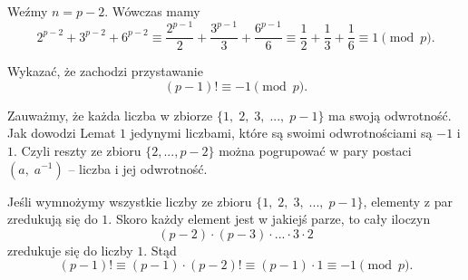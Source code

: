 \noindent
Weźmy $n = p-2$. Wówczas mamy
\[ 
	2^{p-2} + 3^{p-2} + 6^{p-2} \equiv \frac{2^{p-1}}{2} + \frac{3^{p-1}}{3} + \frac{6^{p-1}}{6} \equiv \frac{1}{2} + \frac{1}{3} + \frac{1}{6} \equiv 1 \pmod{p}.
\]

\begin{problem}{4}
	Wykazać, że zachodzi przystawanie
	\[
		(p - 1)! \equiv -1 \pmod{p}.
	\]
\end{problem}

\noindent
Zauważmy, że każda liczba w zbiorze $\{1,\; 2,\; 3,\; ...,\; p-1\}$ ma swoją odwrotność. Jak dowodzi Lemat $1$ jedynymi liczbami, które są swoimi odwrotnościami są $-1$ i $1$. Czyli reszty ze zbioru $\{2, ..., p-2\}$ można pogrupować w pary postaci $(a,\; a^{-1})$ -- liczba i jej odwrotność. 

Jeśli wymnożymy wszystkie liczby ze zbioru $\{1,\; 2,\; 3,\; ...,\; p-1\}$, elementy z par zredukują się do $1$. Skoro każdy element jest w jakiejś parze, to cały iloczyn 
\[
	(p-2)\cdot (p-3) \cdot ... \cdot 3 \cdot 2
\] 
zredukuje się do liczby $1$. Stąd
\[
	(p-1)! \equiv (p-1) \cdot (p-2)! \equiv (p - 1) \cdot 1 \equiv -1 \pmod{p}.
\]
